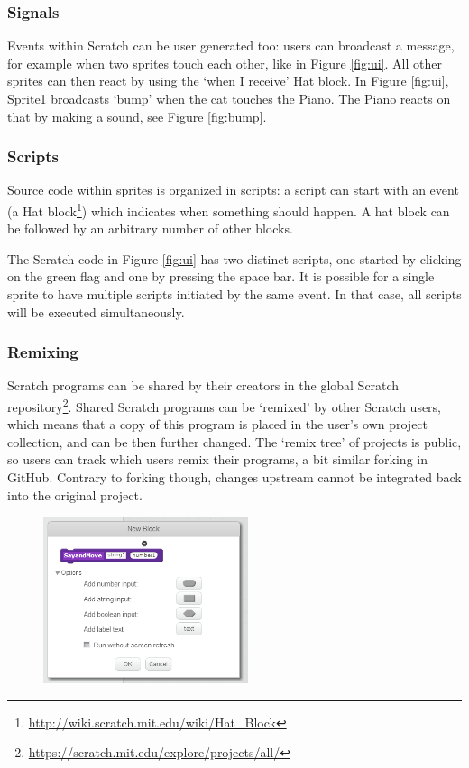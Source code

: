 \documentclass{sig-alternate}
\begin{document}
\subsubsection{Signals}
Events within Scratch can be user generated too: users can broadcast a message, for example when two sprites touch each other, like in Figure \ref{fig:ui}. All other sprites can then react by using the `when I receive' Hat block. In Figure \ref{fig:ui}, Sprite1 broadcasts `bump' when the cat touches the Piano. The Piano reacts on that by making a sound, see Figure \ref{fig:bump}.

\subsubsection{Scripts}
Source code within sprites is organized in scripts: a script can start with an event (a Hat block\footnote{\url{http://wiki.scratch.mit.edu/wiki/Hat_Block}}) which indicates when something should happen. A hat block can be followed by an arbitrary number of other blocks. 

The Scratch code in Figure \ref{fig:ui} has two distinct scripts, one started by clicking on the green flag and one by pressing the space bar. It is possible for a single sprite to have multiple scripts initiated by the same event. In that case, all scripts will be executed simultaneously.

\subsubsection{Remixing}
Scratch programs can be shared by their creators in the global Scratch repository\footnote{\url{https://scratch.mit.edu/explore/projects/all/}}. Shared Scratch programs can be `remixed' by other Scratch users, which means that a copy of this program is placed in the user's own project collection, and can be then further changed. The `remix tree' of projects is public, so users can track which users remix their programs, a bit similar forking in GitHub. Contrary to forking though, changes upstream cannot be integrated back into the original project.

\begin{figure}
	\begin{center}
		\includegraphics[width=6cm]{fig/makeBlockSmall.png}
		\caption{}
		\label{fig:makeBlock}
	\end{center}
\end{figure} 
\end{document}

